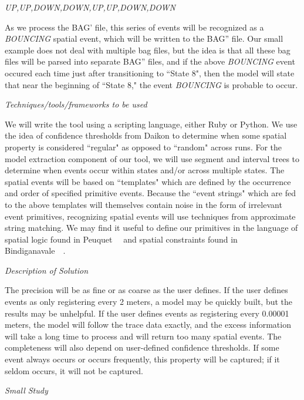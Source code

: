 \emph{UP,UP,DOWN,DOWN,UP,UP,DOWN,DOWN}

As we process the BAG' file, this series of events will be recognized as a \emph{BOUNCING} spatial event, which will be written to the BAG'' file.  
Our small example does not deal with multiple bag files, but the idea is that all these bag files will be parsed into separate BAG'' files, and if the above \emph{BOUNCING} event occured each time just after transitioning to ``State 8", then the model will state that near the beginning of ``State 8," the event \emph{BOUNCING} is probable to occur.

\emph{Techniques/tools/frameworks to be used}

We will write the tool using a scripting language, either Ruby or Python.
We use the idea of confidence thresholds from Daikon to determine when some spatial property is considered ``regular" as opposed to ``random" across runs. 
For the model extraction component of our tool, we will use segment and interval trees to determine when events occur within states and/or across multiple states.
The spatial events will be based on ``templates" which are defined by the occurrence and order of specified primitive events.
Because the ``event strings" which are fed to the above templates will themselves contain noise in the form of irrelevant event primitives, recognizing spatial events will use techniques from approximate string matching.
We may find it useful to define our primitives in the language of spatial logic found in Peuquet~\etal~\cite{peuquet1986use} and spatial constraints found in Bindiganavale~\etal~\cite{bindiganavale1998motion}. 

\emph{Description of Solution}

The precision will be as fine or as coarse as the user defines.
If the user defines events as only registering every 2 meters, a model may be quickly built, but the results may be unhelpful.
If the user defines events as registering every 0.00001 meters, the model will follow the trace data exactly, and the excess information will take a long time to process and will return too many spatial events.
The completeness will also depend on user-defined confidence thresholds.
If some event always occurs or occurs frequently, this property will be captured; if it seldom occurs, it will not be captured.  

\emph{Small Study}

